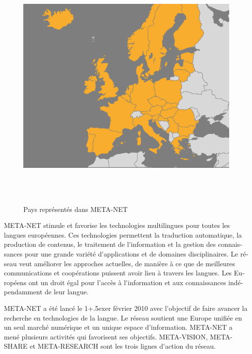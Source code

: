\documentclass[]{../metanetpaper}
\begin{document}
\begin{french}
\begin{multicols}{2}
\begin{figure}[!ht]
\begin{center}
  \includegraphics[height=5.0in]{../_media/french/french_pix10_europa_map.png}
  \caption{Pays représentés dans META-NET}
  \label{fig:metanet_countries}
\end{center}
\end{figure}

META-NET stimule et favorise les technologies multilingues pour toutes les langues européennes. Ces technologies permettent la traduction automatique, la production de contenus, le traitement de l{\mbox '}information et la gestion des connaissances pour une grande variété d{\mbox '}applications et de domaines disciplinaires. Le réseau veut améliorer les approches actuelles, de manière à ce que de meilleures communications et coopérations puissent avoir lieu à travers les langues. Les Européens ont un droit égal pour l'accès à l{\mbox '}information et aux connaissances indépendamment de leur langue. 

META-NET a été lancé le 1\raise+.5ex\hbox{er} février 2010 avec l{\mbox '}objectif de faire avancer la recherche en technologies de la langue. Le réseau soutient une Europe unifiée en un seul marché numérique et un unique espace d{\mbox '}information. META-NET a mené plusieurs activités qui favorisent ses objectifs. META-VISION, META-SHARE et META-RESEARCH sont les trois lignes d{\mbox '}action du réseau.


\end{multicols}
\end{french}
\end{document}

